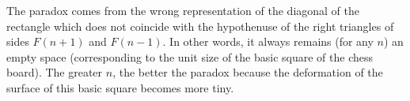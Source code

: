 The paradox comes from the wrong representation of the diagonal of the rectangle which does not coincide with the hypothenuse
of the right triangles of sides $F(n+1)$ and $F(n-1)$.
In other words, it always remains (for any $n$) an empty space (corresponding to the unit size of the basic square of the chess board).
The greater $n$, the better the paradox because the deformation of the surface of this basic square becomes more tiny. 


%
%




